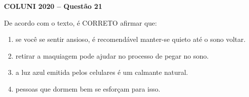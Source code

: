 \textbf{COLUNI 2020 -- Questão 21}\par\medskip De acordo com o texto, é CORRETO afirmar que:\begin{enumerate}
\item se você se sentir ansioso, é recomendável manter-se quieto até o sono voltar.
\item retirar a maquiagem pode ajudar no processo de pegar no sono.
\item a luz azul emitida pelos celulares é um calmante natural.
\item pessoas que dormem bem se esforçam para isso.\end{enumerate}